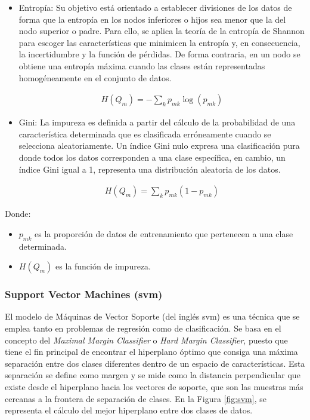 \begin{itemize}
    \item Entropía: Su objetivo está orientado a establecer divisiones de los datos de forma que la entropía en los nodos inferiores o hijos sea menor que la del nodo superior o padre. Para ello, se aplica la teoría de la entropía de Shannon \cite{rfmedium2} para escoger las características que minimicen la entropía y, en consecuencia, la incertidumbre y la función de pérdidas. De forma contraria, en un nodo se obtiene una entropía máxima cuando las clases están representadas homogéneamente en el conjunto de datos.
    
    \begin{equation}
        \begin{aligned}
            H(Q_m) = - \sum_k p_{mk} \log(p_{mk})
        \end{aligned}
    \end{equation}
    
    \item Gini: La impureza es definida a partir del cálculo de la probabilidad de una característica determinada que es clasificada erróneamente cuando se selecciona aleatoriamente. Un índice Gini nulo expresa una clasificación pura donde todos los datos corresponden a una clase específica, en cambio, un índice Gini igual a 1, representa una distribución aleatoria de los datos.
    
    \begin{equation}
        \begin{aligned}
            H(Q_m) = \sum_k p_{mk} (1 - p_{mk})
        \end{aligned}
    \end{equation}
\end{itemize}

Donde:
\begin{itemize}
    \renewcommand{\labelitemi}{}
    \item \(p_{mk}\) es la proporción de datos de entrenamiento que pertenecen a una clase determinada.
    \item \(H(Q_m)\) es la función de impureza.
\end{itemize}


\subsubsection{Support Vector Machines (\acrshort{svm})}
\label{sec:mlsvm}

El modelo de Máquinas de Vector Soporte (del inglés \acrfull{svm}) es una técnica que se emplea tanto en problemas de regresión como de clasificación. Se basa en el concepto del \textit{Maximal Margin Classifier} o \textit{Hard Margin Classifier}, puesto que tiene el fin principal de encontrar el hiperplano óptimo que consiga una máxima separación entre dos clases diferentes dentro de un espacio de características. Esta separación se define como margen y se mide como la distancia perpendicular que existe desde el hiperplano hacia los vectores de soporte, que son las muestras más cercanas a la frontera de separación de clases. En la Figura \ref{fig:svm}, se representa el cálculo del mejor hiperplano entre dos clases de datos. \cite{svmmedium2} \cite{svmciencia}

